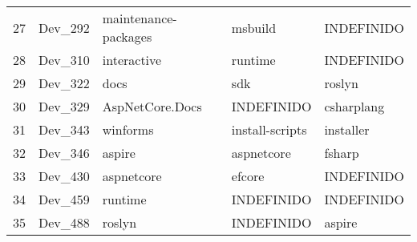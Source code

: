 \begin{tabular}{lllll}
27 & Dev_292 & maintenance-packages & msbuild & INDEFINIDO \\
28 & Dev_310 & interactive & runtime & INDEFINIDO \\
29 & Dev_322 & docs & sdk & roslyn \\
30 & Dev_329 & AspNetCore.Docs & INDEFINIDO & csharplang \\
31 & Dev_343 & winforms & install-scripts & installer \\
32 & Dev_346 & aspire & aspnetcore & fsharp \\
33 & Dev_430 & aspnetcore & efcore & INDEFINIDO \\
34 & Dev_459 & runtime & INDEFINIDO & INDEFINIDO \\
35 & Dev_488 & roslyn & INDEFINIDO & aspire \\
\end{tabular}
